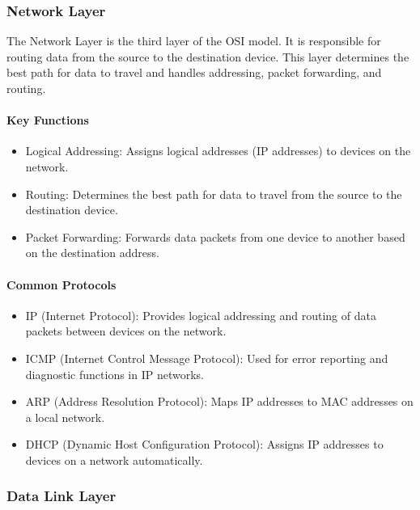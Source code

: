 \documentclass[a4paper]{article}
\begin{document}
    \subsubsection{Network Layer}

    The Network Layer is the third layer of the OSI model. It is responsible for routing data from the source to the destination device. This layer determines the best path for data to travel and handles addressing, packet forwarding, and routing.

    \paragraph{Key Functions}

    \begin{itemize}
        \item Logical Addressing: Assigns logical addresses (IP addresses) to devices on the network.
        \item Routing: Determines the best path for data to travel from the source to the destination device.
        \item Packet Forwarding: Forwards data packets from one device to another based on the destination address.
    \end{itemize}

    \paragraph{Common Protocols}

    \begin{itemize}
        \item IP (Internet Protocol): Provides logical addressing and routing of data packets between devices on the network.
        \item ICMP (Internet Control Message Protocol): Used for error reporting and diagnostic functions in IP networks.
        \item ARP (Address Resolution Protocol): Maps IP addresses to MAC addresses on a local network.
        \item DHCP (Dynamic Host Configuration Protocol): Assigns IP addresses to devices on a network automatically.
    \end{itemize}


    \subsubsection{Data Link Layer}
\end{document}
